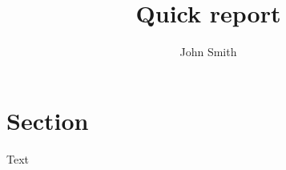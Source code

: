 \documentclass{rsuqfrontpage}
\title{Quick report}
\author{John Smith}
\begin{document}
	
\section{Section}
Text
\end{document}
